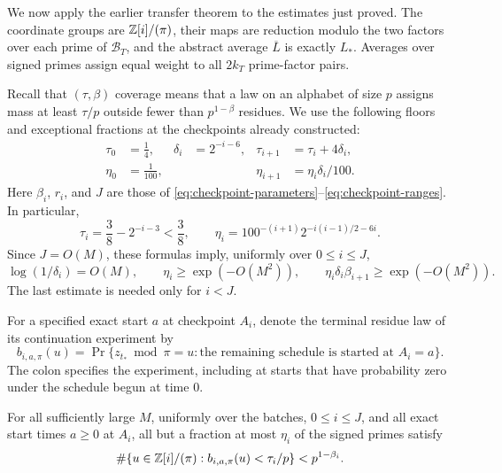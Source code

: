 We now apply the earlier transfer theorem to the estimates just proved.
The coordinate groups are \(\mathbb Z[i]/(\pi)\), their maps are reduction
modulo the two factors over each prime of \(\mathcal B_T\), and the
abstract average \(\overline L\) is exactly \(L_*\).
Averages over signed primes assign equal weight to all \(2k_T\)
prime-factor pairs.

Recall that \((\tau,\beta)\) coverage means that a law on an alphabet
of size \(p\) assigns mass at least \(\tau/p\) outside fewer than
\(p^{1-\beta}\) residues. We use the following floors and exceptional
fractions at the checkpoints already constructed:
\begin{align}
 \tau_0&=\tfrac14,& \delta_i&=2^{-i-6},&
 \tau_{i+1}&=\tau_i+4\delta_i,
 \label{eq:coverage-parameters}\\
 \eta_0&=\tfrac1{100},&&&
 \eta_{i+1}&=\eta_i\delta_i/100.\label{eq:native-eta}
\end{align}
Here \(\beta_i\), \(r_i\), and \(J\) are those of
\eqref{eq:checkpoint-parameters}--\eqref{eq:checkpoint-ranges}.
In particular,
\[
 \tau_i=\frac38-2^{-i-3}<\frac38,\qquad
 \eta_i=100^{-(i+1)}2^{-i(i-1)/2-6i}.
\]
Since \(J=O(M)\), these formulas imply, uniformly over \(0\le i\le J\),
\begin{equation}\label{eq:coverage-parameter-bounds}
 \log(1/\delta_i)=O(M),\qquad
 \eta_i\ge\exp(-O(M^2)),
 \qquad \eta_i\delta_i\beta_{i+1}\ge\exp(-O(M^2)).
\end{equation}
The last estimate is needed only for \(i<J\).

For a specified exact start \(a\) at checkpoint \(A_i\), denote the
terminal residue law of its continuation experiment by
\[
 b_{i,a,\pi}(u)=
 \Pr\{z_{t_*}\bmod\pi=u:
       \text{the remaining schedule is started at }A_i=a\}.
\]
The colon specifies the experiment, including at starts that have
probability zero under the schedule begun at time \(0\).

\begin{proposition}\label{prop:coverage}
For all sufficiently large \(M\), uniformly over the batches,
\(0\le i\le J\), and all exact start times \(a\ge0\) at \(A_i\),
all but a fraction at most \(\eta_i\) of the signed primes satisfy
\begin{equation}\label{eq:coverage}
 \#\{u\in\mathbb Z[i]/(\pi):b_{i,a,\pi}(u)<\tau_i/p\}
 <p^{1-\beta_i}.
\end{equation}
\end{proposition}

